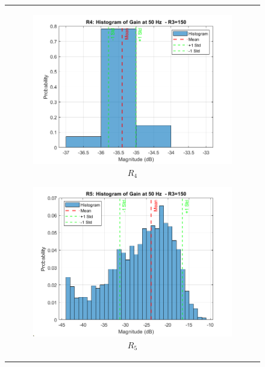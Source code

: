 \documentclass[hidelinks,12pt]{article}
\begin{document}
\begin{figure}[!h]
{\begin{tabular}{c}
				\begin{subfigure}[h]{0.4\textwidth}
					\centering
					\includegraphics[width=\textwidth]{figures/r3=150/r4.png}
					\caption{$R_4$}
				\end{subfigure}
				\hfill
				\begin{subfigure}[h]{0.4\textwidth}
					\centering
					\includegraphics[width=\textwidth]{figures/r3=150/r5.png}
					\caption{$R_5$}
				\end{subfigure}
				\hfill
				\begin{subfigure}[h]{0.4\textwidth}
					\centering

\end{subfigure}
\end{tabular}}
\end{figure}
\end{document}

